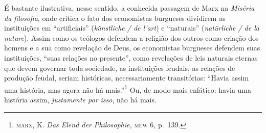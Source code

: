É bastante ilustrativa, nesse sentido, a conhecida passagem de Marx na
\emph{Miséria da filosofia}, onde critica o fato dos economistas
burgueses dividirem as instituições em ``artificiais''
(\emph{künstliche / de l'art}) e ``naturais'' (\emph{natürliche /
de la nature}). Assim como os teólogos defendem a religião dos outros
como criação dos homens e a sua como revelação de Deus, os economistas
burgueses defendem suas instituições, ``suas relações no presente'',
como revelações de leis naturais eternas que devem governar toda
sociedade, as instituições feudais, as relações de produção feudal,
seriam históricas, necessariamente transitórias: ``Havia assim %
uma história, mas agora não há mais.''\footnote{\textsc{marx}, K.
  \emph{Das Elend der Philosophie,} \textsc{mew} 6, p.~139.} Ou, de modo
mais enfático: havia uma história assim, \emph{justamente por isso}, não
há mais.

